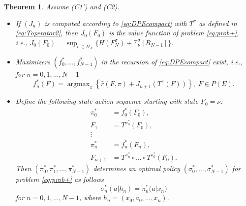 \documentclass[reqno, 12pt]{amsart}%
\newcommand{\EE}{\mathbb{E}}
\DeclareMathOperator*{\argmax}{argmax}
\newtheorem{theorem}{Theorem}
\theoremstyle{definition}
\numberwithin{equation}{section} \numberwithin{theorem}{section}
\begin{document}
\begin{theorem}\label{theo:finite_spec}
Assume (C1') and (C2). 
\begin{itemize}
    \item[a)] If $(J_n)$ is computed according to \eqref{eq:DPEcompact} with $T^\pi$ as defined in \eqref{eq:Toperator2}, then $J_0(F_0)$ is the value function of problem \eqref{eq:prob+}, i.e.,
    $J_0(F_0)= \sup_{\sigma\in \Pi_N} \big\{ H(F_N^\sigma) +  \EE_\nu^\sigma [R_{N-1}] \}$.
    \item[b)] Maximizers $(f_0^*,\ldots,f_{N-1}^*)$ in the recursion of \eqref{eq:DPEcompact} exist, i.e., for $n=0,1,\ldots,N-1$
    $$ f_n^*(F) = \argmax_\pi  \left\{ \hat r (F,\pi)+ J_{n+1}(T^\pi(F)) \right\},\; F \in P(E).$$
    \item[c)] Define the following state-action sequence starting with state $F_0=\nu$:
    \begin{align*}
    \pi_0^* &= f_0^*(F_0),\\
    F_1 &= T^{\pi_0^*}(F_0),\\
    \vdots &\\
    \pi_n^* &= f_n^*(F_n),\\
    F_{n+1} &= T^{\pi_{n}^*}\circ \ldots \circ T^{\pi_0^*}(F_0).
\end{align*}
Then  $(\pi_0^*,\pi_1^*,\ldots,\pi_{N-1}^*)$  
determines  an optimal policy $(\sigma_0^*,\ldots, 
\sigma_{N-1}^*)$ for problem \eqref{eq:prob+} as 
follows $$\sigma_n^*(a|h_n)= \pi_n^*\big(a\big|
x_n\big)$$ for $n=0,1,\ldots,N-1$, where $h_n=(x_0,a_0,\ldots,x_n).$
\end{itemize}
\end{theorem}
\end{document}
